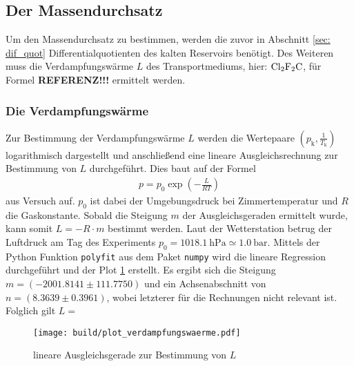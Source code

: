 



\subsection[]{Der Massendurchsatz}
Um den Massendurchsatz zu bestimmen, werden die zuvor in Abschnitt \ref{sec: dif_quot} Differentialquotienten des kalten Reservoirs benötigt.
Des Weiteren muss die Verdampfungswärme $L$ des Transportmediums, hier: $\ce{Cl2F2C}$, für Formel \textbf{REFERENZ!!!} ermittelt werden.


\subsubsection[]{Die Verdampfungswärme}
Zur Bestimmung der Verdampfungswärme $L$ werden die Wertepaare $\left(p_{\text{k}}, \frac{1}{T_{\text{k}}}\right)$ logarithmisch dargestellt
und anschließend eine lineare Ausgleichsrechnung zur Bestimmung von $L$ durchgeführt.
Dies baut auf der Formel 
\begin{align*}
    p = p_0 \exp{\left(-\frac{L}{RT}\right)}
\end{align*}
aus Versuch \cite[]{man:v203} auf.
$p_0$ ist dabei der Umgebungsdruck bei Zimmertemperatur und $R$ die Gaskonstante.
Sobald die Steigung $m$ der Ausgleichsgeraden ermittelt wurde, kann somit $L = -R \cdot m$ bestimmt werden.
Laut der Wetterstation \cite*[][]{wetterstation} betrug der Luftdruck am Tag des Experiments
$p_0 = \qty[]{1018.1}{\hecto\pascal} \simeq \qty[]{1.0}{\bar}$.
Mittels der Python \cite[]{python} Funktion \texttt{polyfit} aus dem Paket \texttt{numpy} \cite[]{numpy} wird die lineare Regression durchgeführt und
der Plot \ref{fig:ausgleichsgerade} erstellt.
Es ergibt sich die Steigung $m = \left(-2001.8141\pm 111.7750 \right)$ und ein Achsenabschnitt von $n = \left( 8.3639 \pm 0.3961 \right)$, 
wobei letzterer für die Rechnungen nicht relevant ist. 
Folglich gilt $L = $ %
\begin{figure}
    \texttt{[image: build/plot\_verdampfungswaerme.pdf]}
    \caption[]{lineare Ausgleichsgerade zur Bestimmung von $L$}
    \label{fig:ausgleichsgerade}
\end{figure}






